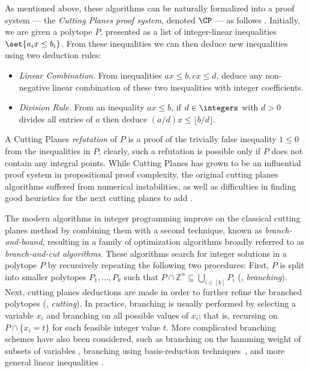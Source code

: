 As mentioned above, these algorithms can be naturally formalized into a proof system --- the \emph{Cutting Planes proof system}, denoted $\CP$ --- as follows \cite{Chvatal73a}.
Initially, we are given a polytope $P$, presented as a list of integer-linear inequalities $\set{a_i x \leq b_i}$.
From these inequalities we can then deduce new inequalities using two deduction rules:
\begin{itemize}
	\item \emph{Linear Combination.} From inequalities $ax \leq b, cx \leq d$, deduce any non-negative linear combination of these two inequalities with integer coefficients.
	\item \emph{Division Rule.} From an inequality $ax \leq b$, if $d \in \integers$ with $d > 0$ divides all entries of $a$ then deduce $(a/d)x \leq \lfloor b/d \rfloor$.
\end{itemize}
A Cutting Planes \emph{refutation} of $P$ is a proof of the trivially false inequality $1 \leq 0$ from the inequalities in $P$; clearly, such a refutation is possible only if $P$ does not contain any integral points.
While Cutting Planes has grown to be an influential proof system in propositional proof complexity, the original cutting planes algorithms suffered from numerical instabilities, as well as difficulties in finding good heuristics for the next cutting planes to add \cite{gomory1963algorithm}.

The modern algorithms in integer programming improve on the classical cutting planes method by combining them with a second technique, known as \emph{branch-and-bound}, resulting in a family of optimization algorithms broadly referred to as \emph{branch-and-cut algorithms}. 
These algorithms search for integer solutions in a polytope $P$ by recursively repeating the following two procedures: First, $P$ is split into smaller polytopes $P_1,\ldots, P_k$  such that $P \cap \mathbb{Z}^n \subseteq \bigcup_{i\in [k]} P_i$ (\ie, \emph{branching}). 
Next, cutting planes deductions are made in order to further refine the branched polytopes (\ie, \emph{cutting}). 
In practice, branching is usually performed by selecting a variable $x_i$ and branching on all possible values of $x_i$; that is, recursing on $P \cap \{x_i = t\}$ for each feasible integer value $t$.
More complicated branching schemes have also been considered, such as branching on the hamming weight of subsets of variables \cite{FischettiL03}, branching using basis-reduction techniques~\cite{AardalL04,KrishnamoorthyP09,AardalBHLS00}, and more general linear inequalities \cite{OwenM01,mahajanRT09,KaramanovC11}. 

